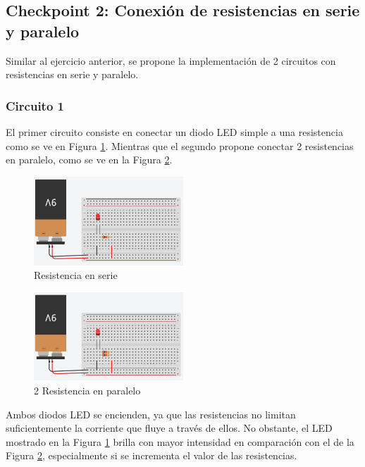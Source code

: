 \documentclass{article}
\begin{document}
\subsection{Checkpoint 2: Conexión de resistencias en serie y paralelo}

Similar al ejercicio anterior, se propone la implementación de 2 circuitos con resistencias en serie y paralelo.

\subsubsection{Circuito 1}

El primer circuito consiste en conectar un diodo LED simple a una resistencia como se ve en Figura \ref{fig:resistencia_serie}. Mientras que el segundo propone conectar 2 resistencias en paralelo, como se ve en la Figura \ref{fig:resistencia_paralelo}. 

\begin{figure}[H]
    \centering
    \includegraphics[width=0.5\textwidth]{./img/ckpt_2_1.png}
    \caption{Resistencia en serie}
    \label{fig:resistencia_serie}
\end{figure}


\begin{figure}[H]
    \centering
    \includegraphics[width=0.5\textwidth]{./img/ckpt_2_2.png}
    \caption{2 Resistencia en paralelo}
    \label{fig:resistencia_paralelo}
\end{figure}

Ambos diodos LED se encienden, ya que las resistencias no limitan suficientemente la corriente que fluye a través de ellos. No obstante, el LED mostrado en la Figura \ref{fig:resistencia_serie} brilla con mayor intensidad en comparación con el de la Figura \ref{fig:resistencia_paralelo}, especialmente si se incrementa el valor de las resistencias.
\end{document}
